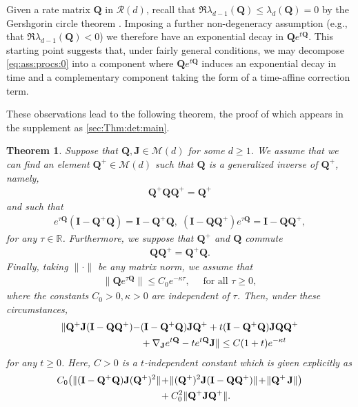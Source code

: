 \documentclass[9pt,twocolumn,twoside]{pnas-new}
\newtheorem{Theorem}{Theorem}
\newcommand{\bbR}{{\mathbb R}}
\newcommand{\?}{\textbf{?}}
\newcommand{\QQ}{\mathbf{Q}}
\newcommand{\JJ}{\mathbf{J}}
\newcommand{\II}{\mathbf{I}}
\begin{document}
Given a rate matrix $\QQ$ in $\mathcal{R}(d)$, recall that
$\Re \lambda_{d-1}(\QQ) \leq \lambda_{d}(\QQ)= 0$ by
the Gershgorin circle theorem \cite[Theorem
6.1.1]{horn:johnson:2012}.  Imposing a further
non-degeneracy assumption (e.g., that $\Re \lambda_{d-1}(\QQ)< 0$) we
therefore have an exponential decay in $\QQ e^{t\QQ}$.  This starting
point suggests that, under fairly general conditions, we may decompose
\eqref{eq:ass:procs:0} into a component where $\QQ e^{t\QQ}$ induces
an exponential decay in time and a complementary component taking the
form of a time-affine correction term.

These observations lead to the following theorem, the proof of which appears
in the supplement as \cref{sec:Thm:det:main}.
\begin{Theorem}\label{thm:ass:error}
  Suppose that $\QQ, \JJ \in \mathcal{M}(d)$ for some $d \geq 1$.  We
  assume that we can find an element $\QQ^+ \in \mathcal{M}(d)$ such that
  $\QQ$ is a generalized inverse of $\QQ^+$, namely,
  \begin{align}\label{eq:GI:prop}
    \QQ^+ \QQ \QQ^+ = \QQ^+
  \end{align}
  and such that
  \begin{align}\label{eq:MP:proj:prop}
    e^{\tau \QQ}(\II - \QQ^+ \QQ) \!=\!  \II - \QQ^+ \QQ, \;
    (\II - \QQ \QQ^+)e^{\tau \QQ} \!=\!  \II - \QQ \QQ^+,
  \end{align}
  for any $\tau \in \bbR$. Furthermore, we suppose that $\QQ^+$ and
  $\QQ$ commute
  \begin{align}\label{eq:GI:com}
    \QQ \QQ^+ = \QQ^+ \QQ.
  \end{align}
  Finally, taking $\|\cdot\|$ be any matrix norm, we assume that
  \begin{align}\label{eq:qetq:exp:decay}
    \| \QQ e^{\tau \QQ}\| \leq C_0 e^{-\kappa \tau},
    \quad
    \text{ for all } \tau \geq 0,
  \end{align}
  where the constants $C_0 > 0, \kappa > 0$
  are independent of $\tau$.  Then, under these circumstances, 
  \begin{align}\label{eq:ass:error}
    \|\QQ^+ \JJ (\II - \QQ \QQ^{+})-& (\II -\QQ^+ \QQ) \JJ \QQ^{+}
        +t(\II -\QQ^+ \QQ) \JJ \QQ \QQ^{+}
                \notag\\
      &
        +  \nabla_\JJ e^{t \QQ} - t  e^{t\QQ} \JJ\| \leq C(1+ t)e^{-\kappa t}
\end{align}
for any $t \geq 0$.  Here, $C > 0$ is a $t$-independent
constant which is given explicitly as
\begin{align}
  C_0 \big(\| (\II -\QQ^+ \QQ) \JJ (\QQ^{+})^2\|
  \!&+\! \|(\QQ^+)^2\JJ (\II - \QQ \QQ^{+})\|
    \!+\! \|\QQ^+ \hspace{0.5mm}\JJ\|\big)
    \notag\\
    &+ C_0^2 \| \QQ^+  \JJ  \QQ^{+} \|.
      \label{eq:exp:error:ass:er}
  \end{align}
\end{Theorem}
\end{document}
